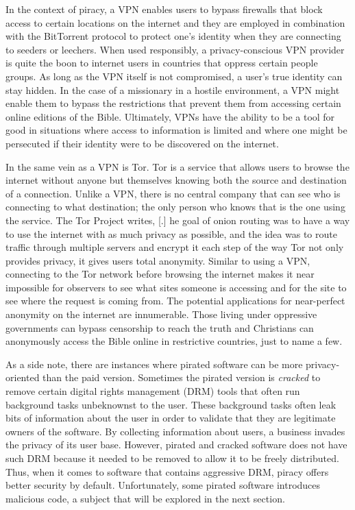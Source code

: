 \documentclass[onecolumn, 12pt]{article}
\begin{document}
\begin{refsection}
In the context of piracy, a VPN enables users to bypass firewalls that block access to
certain locations on the internet and they are employed in combination with the BitTorrent
protocol to protect one's identity when they are connecting to seeders or leechers. When
used responsibly, a privacy-conscious VPN provider is quite the boon to internet users in
countries that oppress certain people groups. As long as the VPN itself is not
compromised, a user's true identity can stay hidden. In the case of a missionary in a
hostile environment, a VPN might enable them to bypass the restrictions that prevent them
from accessing certain online editions of the Bible. Ultimately, VPNs have the ability to
be a tool for good in situations where access to information is limited and where one
might be persecuted if their identity were to be discovered on the internet.

In the same vein as a VPN is Tor. Tor is a service that allows users to browse the
internet without anyone but themselves knowing both the source and destination of a
connection. Unlike a VPN, there is no central company that can see who is connecting to
what destination; the only person who knows that is the one using the service. The Tor
Project writes, [.]{%
  he goal of onion routing was to have a way to use the internet with
  as much privacy as possible, and the idea was to route traffic through
  multiple servers and encrypt it each step of the way%
} Tor not only provides privacy, it gives users total anonymity. Similar to
using a VPN, connecting to the Tor network before browsing the internet makes it
near impossible for observers to see what sites someone is accessing and for the
site to see where the request is coming from.  The potential applications for
near-perfect anonymity on the internet are innumerable. Those living under
oppressive governments can bypass censorship to reach the truth and Christians
can anonymously access the Bible online in restrictive countries, just to name a
few.

As a side note, there are instances where pirated software can be more privacy-oriented
than the paid version. Sometimes the pirated version is \emph{cracked} to remove certain
digital rights management (DRM) tools that often run background tasks unbeknownst to the
user. These background tasks often leak bits of information about the user in order to
validate that they are legitimate owners of the software. By collecting information about
users, a business invades the privacy of its user base. However, pirated and cracked
software does not have such DRM because it needed to be removed to allow it to be freely
distributed. Thus, when it comes to software that contains aggressive DRM, piracy offers
better security by default. Unfortunately, some pirated software introduces malicious
code, a subject that will be explored in the next section.


\end{refsection}
\end{document}
